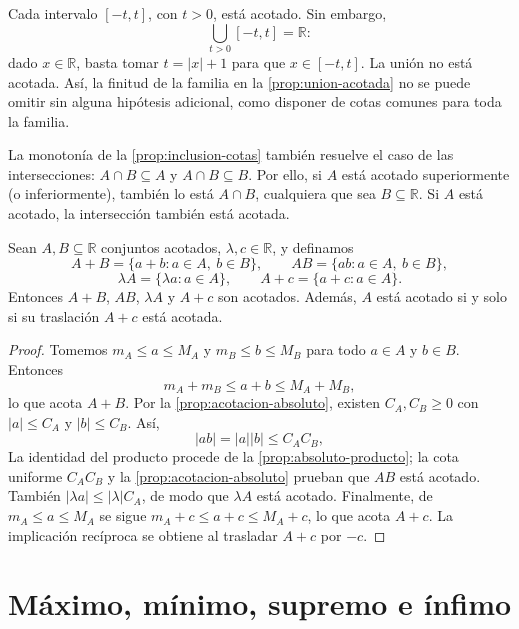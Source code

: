 \begin{example}
Cada intervalo $[-t,t]$, con $t>0$, está acotado. Sin embargo,
\[
\bigcup_{t>0}[-t,t]=\mathbb{R}:
\]
dado $x\in\mathbb{R}$, basta tomar $t=|x|+1$ para que $x\in[-t,t]$. La unión no está acotada. Así, la finitud de la familia en la \cref{prop:union-acotada} no se puede omitir sin alguna hipótesis adicional, como disponer de cotas comunes para toda la familia.
\end{example}

\begin{remark}
La monotonía de la \cref{prop:inclusion-cotas} también resuelve el caso de las intersecciones: $A\cap B\subseteq A$ y $A\cap B\subseteq B$. Por ello, si $A$ está acotado superiormente (o inferiormente), también lo está $A\cap B$, cualquiera que sea $B\subseteq\mathbb{R}$. Si $A$ está acotado, la intersección también está acotada.
\end{remark}

\begin{samepage}
\begin{proposition}
\label{prop:operaciones-acotadas}
Sean $A,B\subseteq\mathbb{R}$ conjuntos acotados, $\lambda,c\in\mathbb{R}$, y definamos
\[
 A+B=\{a+b:a\in A,\ b\in B\},\qquad
 AB=\{ab:a\in A,\ b\in B\},
\]
\[
 \lambda A=\{\lambda a:a\in A\},\qquad
 A+c=\{a+c:a\in A\}.
\]
Entonces $A+B$, $AB$, $\lambda A$ y $A+c$ son acotados. Además, $A$ está acotado si y solo si su traslación $A+c$ está acotada.
\end{proposition}
\end{samepage}

\begin{proof}
Tomemos $m_A\leq a\leq M_A$ y $m_B\leq b\leq M_B$ para todo $a\in A$ y $b\in B$. Entonces
\[
 m_A+m_B\leq a+b\leq M_A+M_B,
\]
lo que acota $A+B$. Por la \cref{prop:acotacion-absoluto}, existen $C_A,C_B\geq0$ con $|a|\leq C_A$ y $|b|\leq C_B$. Así,
\[
 |ab|=|a||b|\leq C_A C_B,
\]
La identidad del producto procede de la \cref{prop:absoluto-producto}; la cota uniforme $C_A C_B$ y la \cref{prop:acotacion-absoluto} prueban que $AB$ está acotado. También $|\lambda a|\leq|\lambda|C_A$, de modo que $\lambda A$ está acotado. Finalmente, de $m_A\leq a\leq M_A$ se sigue $m_A+c\leq a+c\leq M_A+c$, lo que acota $A+c$. La implicación recíproca se obtiene al trasladar $A+c$ por $-c$.
\end{proof}

\section{Máximo, mínimo, supremo e ínfimo}
\label{sec:extremos-supremo-infimo}

